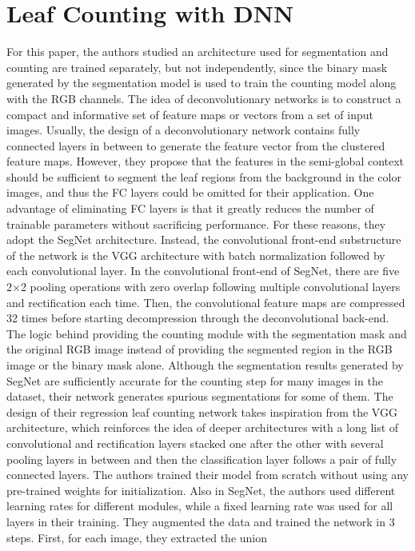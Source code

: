 \section{Leaf Counting with DNN}
For this paper, the authors studied an architecture used for segmentation and counting are trained separately, but not independently, since the binary mask generated by
the segmentation model is used to train the counting model along with the RGB channels. The idea of deconvolutionary networks is to construct a compact and informative
set of feature maps or vectors from a set of input images. Usually, the design of a deconvolutionary network contains fully connected layers in between to generate the
feature vector from the clustered feature maps. However, they propose that the features in the semi-global context should be sufficient to segment the leaf regions from 
the background in the color images, and thus the FC layers could be omitted for their application. One advantage of eliminating FC layers is that it greatly reduces the
number of trainable parameters without sacrificing performance. For these reasons, they adopt the SegNet architecture. Instead, the convolutional front-end substructure
of the network is the VGG architecture with batch normalization followed by each convolutional layer. In the convolutional front-end of SegNet, there are five 2×2 pooling
operations with zero overlap following multiple convolutional layers and rectification each time. Then, the convolutional feature maps are compressed 32 times before
starting decompression through the deconvolutional back-end. The logic behind providing the counting module with the segmentation mask and the original RGB image instead
of providing the segmented region in the RGB image or the binary mask alone. Although the segmentation results generated by SegNet are sufficiently accurate for the
counting step for many images in the dataset, their network generates spurious segmentations for some of them. The design of their regression leaf counting network takes
inspiration from the VGG architecture, which reinforces the idea of deeper architectures with a long list of convolutional and rectification layers stacked one after
the other with several pooling layers in between and then the classification layer follows a pair of fully connected layers. The authors trained their model from
scratch without using any pre-trained weights for initialization. Also in SegNet, the authors used different learning rates for different modules, while a fixed
learning rate was used for all layers in their training. They augmented the data and trained the network in 3 steps. First, for each image, they extracted the union
